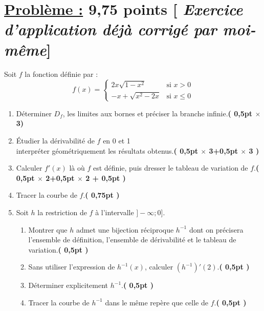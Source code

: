 \documentclass[12pt,a4paper]{article}
\begin{document}
\section*{\underline{Problème :} 9,75 points [\textit{ Exercice d'application déjà corrigé par moi-même}]} 

Soit $f$ la fonction définie par :
\[
f(x) =
\begin{cases} 
2x\sqrt{1 - x^2} & \text{si } x > 0 \\ 
-x + \sqrt{x^2 - 2x} & \text{si } x \leq 0 
\end{cases}
\]

\begin{enumerate}
    \item Déterminer $D_f$, les limites aux bornes et préciser la branche infinie.\hfill \textbf{( 0,5pt $\times$ 3)}
    \item Étudier la dérivabilité de $f$ en 0 et 1\\interpréter géométriquement les résultats obtenus.\hfill \textbf{( 0,5pt $\times$ 3+0,5pt $\times$ 3 )}
    \item Calculer $f'(x)$ là où $f$ est définie, puis dresser le tableau de variation de $f$.\hfill \textbf{( 0,5pt $\times$ 2+0,5pt $\times$ 2 + 0,5pt )}
    \item Tracer la courbe de $f$.\hfill \textbf{( 0,75pt )}
    \item Soit $h$ la restriction de $f$ à l’intervalle $]-\infty ; 0]$.
    \begin{enumerate}
        \item Montrer que $h$ admet une bijection réciproque $h^{-1}$ dont on précisera l’ensemble de définition, l’ensemble de dérivabilité et le tableau de variation.\hfill \textbf{( 0,5pt )}
        \item Sans utiliser l’expression de $h^{-1}(x)$, calculer $(h^{-1})'(2)$.\hfill \textbf{( 0,5pt )}
        \item Déterminer explicitement $h^{-1}$.\hfill \textbf{( 0,5pt )}
        \item Tracer la courbe de $h^{-1}$ dans le même repère que celle de $f$.\hfill \textbf{( 0,5pt )}
    \end{enumerate}
\end{enumerate}
\end{document}
